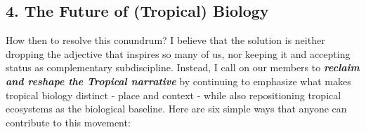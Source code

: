 \documentclass[
  12pt,
  man, donotrepeattitle]{apa6}
\begin{document}
\hypertarget{the-future-of-tropical-biology}{%
\subsection{4. The Future of (Tropical) Biology}\label{the-future-of-tropical-biology}}

How then to resolve this conundrum? I believe that the solution is neither dropping the adjective that inspires so many of us, nor keeping it and accepting status as complementary subdiscipline. Instead, I call on our members to \textbf{\emph{reclaim and reshape the Tropical narrative}} by continuing to emphasize what makes tropical biology distinct - place and context - while also repositioning tropical ecosystems as the biological baseline. Here are six simple ways that anyone can contribute to this movement:
\end{document}
